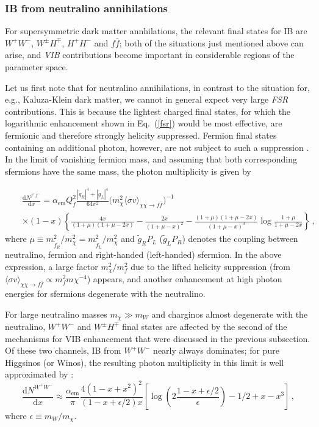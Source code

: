 \subsubsection{IB from neutralino annihilations}

For supersymmetric dark matter annhilations,  the relevant final states for IB are 
$W^+W^-$, $W^\pm H^\mp$, $H^+H^-$ and $f\bar f$; both of the situations just 
mentioned above can arise, and \emph{VIB} contributions become important in 
considerable regions of the parameter space.

Let us first note that for neutralino annihilations, in contrast to the situation 
for, e.g.,  Kaluza-Klein dark matter, we cannot in general expect very large 
\emph{FSR} contributions. This is because the lightest charged final states, for 
which the logarithmic enhancement shown in Eq.~(\ref{fsr}) would be most effective, 
are fermionic and therefore strongly helicity suppressed. Fermion final states 
containing an additional photon, however, are not subject to such a suppression 
\cite{Bergstrom:1989jr}. In the limit of vanishing fermion mass, and assuming that both 
corresponding sfermions have the same mass, the photon multiplicity is given by 
\cite{Bringmann:2007nk}

\begin{eqnarray}
  &&\frac{\mathrm{d}N^{f^+f^-}} {\mathrm{d}x}= 
\alpha_\mathrm{em}Q^2_f\frac{\left|\tilde g_R\right|^4+\left|\tilde 
g_L\right|^4}{64\pi^2} \Big(m_\chi^2 \langle\sigma v\rangle_{\chi\chi\rightarrow 
f\bar f}\Big)^{-1}\\
 &&\times(1-x)\left\{\frac{4x}{(1+\mu)(1+\mu-2x)}-\frac{2x}{(1+\mu-x)^2}
  -\frac{(1+\mu)(1+\mu-2x)}{(1+\mu-x)^3}\log\frac{1+\mu}{1+\mu-2x}\right\}\,,\nonumber
\end{eqnarray}
where $\mu\equiv m_{{\tilde f}_R}^2/m_\chi^2=m_{{\tilde f}_L}^2/m_\chi^2$ and 
$\tilde g_RP_L$ ($\tilde g_LP_R$) denotes the coupling between neutralino, fermion 
and right-handed (left-handed) sfermion. In the above expression, a large factor 
$m_\chi^2/m_f^2$ due to the lifted helicity suppression (from ${\langle\sigma 
v\rangle}_{\chi\chi\rightarrow f\bar f}\propto m_f^2m\chi^{-4}$) appears, and 
another enhancement at high photon energies for sfermions degenerate with the 
neutralino.

For large neutralino masses $m_\chi\gg m_W$ and charginos almost degenerate with 
the neutralino, $W^+W^-$ and $W^\pm H^\mp$ final states are affected by the second 
of the mechanisms for VIB enhancement that were discussed in the previous 
subsection. Of these two channels, IB from $W^+W^-$ nearly always dominates; for 
pure Higgsinos (or Winos), the resulting photon multiplicity in this limit is well 
approximated by \cite{Bringmann:2007nk,Bergstrom:2005ss}:
\begin{equation}
 \frac{\mathrm{d}N^{W^+W^-}} {\mathrm{d}x} \approx
  \frac{\alpha_\mathrm{em}}{\pi}\frac{4(1-x+x^2)^2}{(1-x+\epsilon/2)x}\left[\log\left(2\frac{1-x+\epsilon/2}{\epsilon}\right)-1/2+x-x^3\right]\,,
\end{equation}
where $\epsilon \equiv m_W/m_\chi$. 

